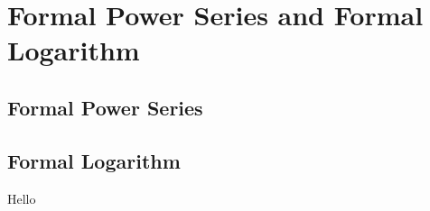 \chapter{Formal Power Series and Formal Logarithm}%
\label{sec:formal-log}

\section{Formal Power Series}

\begin{defn}
\end{defn}


\section{Formal Logarithm}
Hello